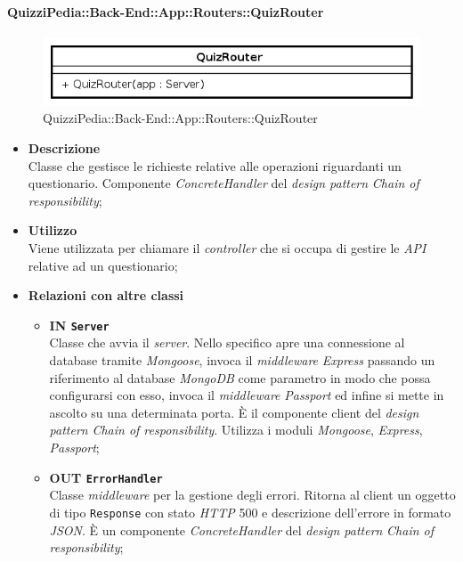 \paragraph{QuizziPedia::Back-End::App::Routers::QuizRouter}
\label{QuizziPedia::Back-End::App::Routers::QuizRouter}
\begin{figure}[ht]
	\centering
	\includegraphics[scale=0.45]{UML/Classi/Back-End/QuizziPedia_Back-End_App_Routers_quizRouter.png}
	\caption{QuizziPedia::Back-End::App::Routers::QuizRouter}
\end{figure}
\FloatBarrier
	\begin{itemize}
		\item \textbf{Descrizione} \\
		Classe che gestisce le richieste relative alle operazioni riguardanti un questionario. Componente \textit{ConcreteHandler} del \textit{design pattern} \textit{Chain of responsibility};
		\item \textbf{Utilizzo} \\
		Viene utilizzata per chiamare il \textit{controller} che si occupa di gestire le \textit{API} relative ad un questionario;
		\item \textbf{Relazioni con altre classi} 
		\begin{itemize}
		\item \textbf{IN \texttt{Server}} \\
			Classe che avvia il \textit{server}. Nello specifico apre una connessione al database tramite \textit{Mongoose}, invoca il \textit{middleware} \textit{Express} passando un riferimento al database \textit{MongoDB} come parametro in modo che possa configurarsi con esso, invoca il \textit{middleware} \textit{Passport} ed infine si mette in ascolto su una determinata porta. È il componente client del \textit{design pattern} \textit{Chain of responsibility}. Utilizza i moduli \textit{Mongoose}, \textit{Express}, \textit{Passport};
		\item \textbf{OUT \texttt{ErrorHandler}} \\
			Classe \textit{middleware} per la gestione degli errori. Ritorna al client un oggetto di tipo \texttt{Response} con stato \textit{HTTP} 500 e descrizione dell'errore in formato \textit{JSON}. È un componente \textit{ConcreteHandler} del \textit{design pattern} \textit{Chain of responsibility};

\end{itemize}
\end{itemize}

